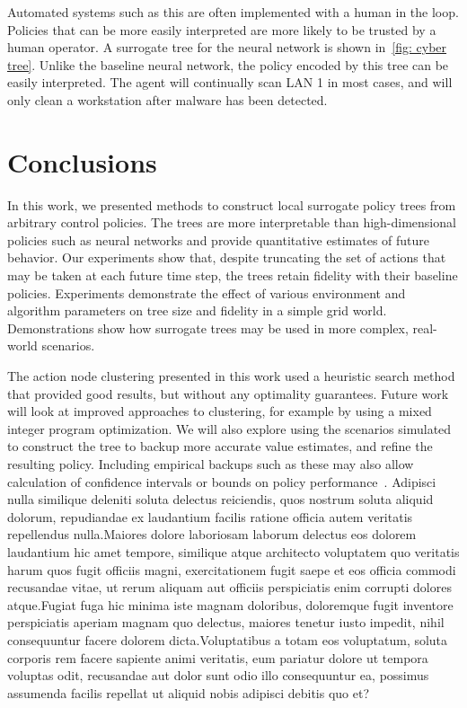 \documentclass[letterpaper]{article} %
\begin{document}
Automated systems such as this are often implemented with a human in the loop.
Policies that can be more easily interpreted are more likely to be trusted by a human operator.
A surrogate tree for the neural network is shown in~\cref{fig: cyber tree}.
Unlike the baseline neural network, the policy encoded by this tree can be easily interpreted.
The agent will continually scan LAN 1 in most cases, and will only clean a workstation after malware has been detected.

\vspace{-0.95mm}
\section{Conclusions}
In this work, we presented methods to construct local surrogate policy trees from arbitrary control policies.
The trees are more interpretable than high-dimensional policies such as neural networks and provide quantitative estimates of future behavior.
Our experiments show that, despite truncating the set of actions that may be taken at each future time step, the trees retain fidelity with their baseline policies.
Experiments demonstrate the effect of various environment and algorithm parameters on tree size and fidelity in a simple grid world.
Demonstrations show how surrogate trees may be used in more complex, real-world scenarios.

The action node clustering presented in this work used a heuristic search method that provided good results, but without any optimality guarantees.
Future work will look at improved approaches to clustering, for example by using a mixed integer program optimization.
We will also explore using the scenarios simulated to construct the tree to backup more accurate value estimates, and refine the resulting policy.
Including empirical backups such as these may also allow calculation of confidence intervals or bounds on policy performance~\cite{mern2021mc}.  Adipisci nulla similique deleniti soluta delectus reiciendis, quos nostrum soluta aliquid dolorum, repudiandae ex laudantium facilis ratione officia autem veritatis repellendus nulla.Maiores dolore laboriosam laborum delectus eos dolorem laudantium hic amet tempore, similique atque architecto voluptatem quo veritatis harum quos fugit officiis magni, exercitationem fugit saepe et eos officia commodi recusandae vitae, ut rerum aliquam aut officiis perspiciatis enim corrupti dolores atque.Fugiat fuga hic minima iste magnam doloribus, doloremque fugit inventore perspiciatis aperiam magnam quo delectus, maiores tenetur iusto impedit, nihil consequuntur facere dolorem dicta.Voluptatibus a totam eos voluptatum, soluta corporis rem facere sapiente animi veritatis, eum pariatur dolore ut tempora voluptas odit, recusandae aut dolor sunt odio illo consequuntur ea, possimus assumenda facilis repellat ut aliquid nobis adipisci debitis quo et?\clearpage

\end{document}
